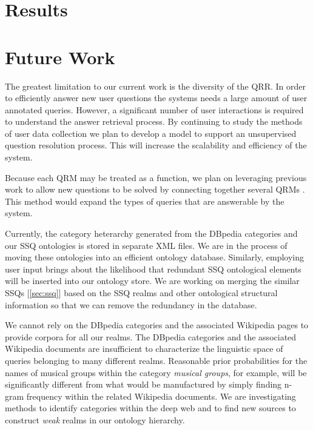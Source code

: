\section{Results}

\section{Future Work}

The greatest limitation to our current work is the diversity of the
QRR.  In order to efficiently answer new user questions the systems
needs a large amount of user annotated queries.  However, a
significant number of user interactions is required to understand the
answer retrieval process.  By continuing to study the methods of user
data collection we plan to develop a model to support an unsupervised
question resolution process.  This will increase the scalability and
efficiency of the system.

Because each QRM may be treated as a function, we plan on leveraging
previous work to allow new questions to be solved by connecting
together several QRMs \cite{morpheus1, transformscout}.  This method
would expand the types of queries that are answerable by the system.

Currently, the category heterarchy generated from the DBpedia
categories and our SSQ ontologies is stored in separate XML files. We
are in the process of moving these ontologies into an efficient
ontology database. Similarly, employing user input brings about the
likelihood that redundant SSQ ontological elements will be inserted
into our ontology store. We are working on merging the similar SSQs
[\ref{sec:ssq}] based on the SSQ realms and other ontological
structural information so that we can remove the redundancy in the
database.

We cannot rely on the DBpedia categories and the associated Wikipedia
pages to provide corpora for all our realms.  The DBpedia categories
and the associated Wikipedia documents are insufficient to
characterize the linguistic space of queries belonging to many
different realms.  Reasonable prior probabilities for the names of
musical groups within the category \emph{musical groups}, for example,
will be significantly different from what would be manufactured by
simply finding n-gram frequency within the related Wikipedia
documents. We are investigating methods to identify categories within
the deep web and to find new sources to construct \textit{weak} realms
in our ontology hierarchy.


